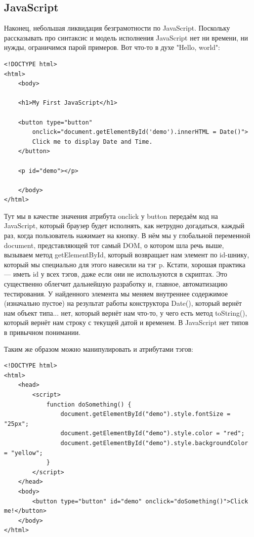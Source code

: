 \documentclass{../../text-style}
\begin{document}
\subsection{JavaScript}

Наконец, небольшая ликвидация безграмотности по JavaScript. Поскольку рассказывать про синтаксис и модель исполнения JavaScript нет ни времени, ни нужды, ограничимся парой примеров. Вот что-то в духе "Hello, world":

\begin{verbatim}
<!DOCTYPE html>
<html>
    <body>

    <h1>My First JavaScript</h1>

    <button type="button"
        onclick="document.getElementById('demo').innerHTML = Date()">
        Click me to display Date and Time.
    </button>

    <p id="demo"></p>

    </body>
</html> 
\end{verbatim}

Тут мы в качестве значения атрибута onclick у button передаём код на JavaScript, который браузер будет исполнять, как нетрудно догадаться, каждый раз, когда пользователь нажимает на кнопку. В нём мы у глобальной переменной document, представляющей тот самый DOM, о котором шла речь выше, вызываем метод getElementById, который возвращает нам элемент по id-шнику, который мы специально для этого навесили на тэг p. Кстати, хорошая практика --- иметь id у всех тэгов, даже если они не используются в скриптах. Это существенно облегчит дальнейшую разработку и, главное, автоматизацию тестирования. У найденного элемента мы меняем внутреннее содержимое (изначально пустое) на результат работы конструктора Date(), который вернёт нам объект типа... нет, который вернёт нам что-то, у чего есть метод toString(), который вернёт нам строку с текущей датой и временем. В JavaScript нет типов в привычном понимании.

Таким же образом можно манипулировать и атрибутами тэгов:

\begin{verbatim}
<!DOCTYPE html>
<html>
    <head>
        <script>
            function doSomething() {
                document.getElementById("demo").style.fontSize = "25px";
                document.getElementById("demo").style.color = "red";
                document.getElementById("demo").style.backgroundColor = "yellow";
            }
        </script>
    </head>
    <body>
        <button type="button" id="demo" onclick="doSomething()">Click me!</button>
    </body>
</html>
\end{verbatim}
\end{document}

